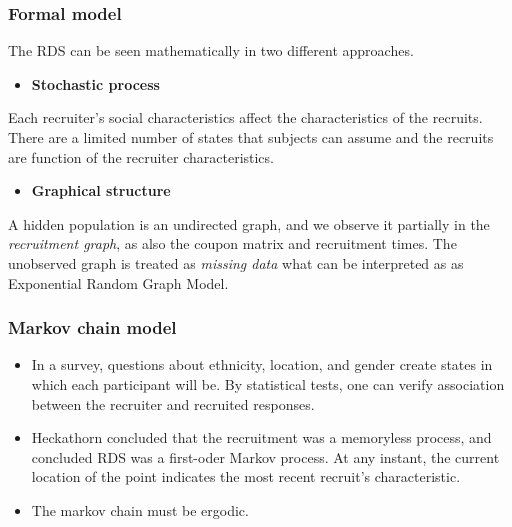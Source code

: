 \documentclass{beamer}
\newcommand{\Space}{\vspace{3ex}}
\begin{document}
\begin{frame}
  
  \frametitle{Formal model}

  The RDS can be seen mathematically in two different approaches. 

  \Space

  \begin{itemize}
    \item {\bf Stochastic process} \cite{heckathorn1997}
  \end{itemize}

  Each recruiter's social characteristics affect the characteristics of the
  recruits. There are a limited number of states that subjects can assume and
  the recruits are function of the recruiter characteristics.

  \Space

  \begin{itemize}
    \item {\bf Graphical structure} \cite{crawford2016}
  \end{itemize}

  A hidden population is an undirected graph, and we observe it partially in
  the {\em recruitment graph}, as also the coupon matrix and recruitment
  times. The unobserved graph is treated as {\em missing data} what can be
  interpreted as as Exponential Random Graph Model.  

\end{frame}

\begin{frame}
\frametitle{Markov chain model}

\begin{itemize}
  \justifying
  \item In a survey, questions about ethnicity, location, and gender create
  states in which each participant will be. By statistical tests, one can
  verify association between the recruiter and recruited responses. 

  \item Heckathorn concluded that the recruitment was a memoryless process, and concluded RDS was a first-oder Markov process. At
  any instant, the current location of the point indicates the most recent
  recruit's characteristic. 

  \item The markov chain must be ergodic. 
\end{itemize}

\end{frame}
\end{document}
